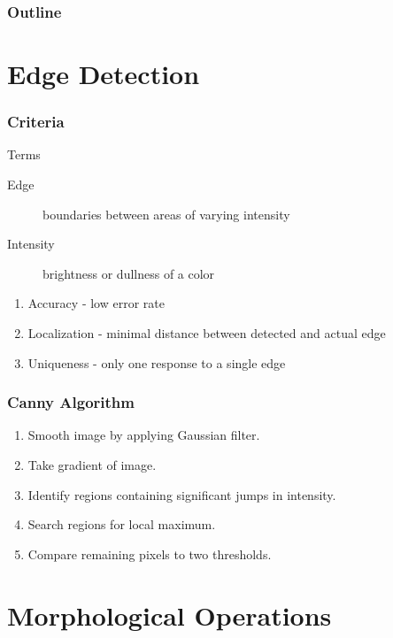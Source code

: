 \documentclass{beamer}
\newcommand{\linespace}{\vskip 0.25cm}
\begin{document}
\begin{frame}
  \frametitle{Outline}
  \tableofcontents[hideallsubsections]
\end{frame}

\section[Edge Detection]{Edge Detection}

\begin{frame}
\frametitle{Criteria}
Terms
\begin{description}
\item[Edge] boundaries between areas of varying intensity
\item[Intensity] brightness or dullness of a color
\end{description}
\linespace
\linespace
\begin{enumerate}
\item Accuracy - low error rate
\item Localization - minimal distance between detected and actual edge
\item Uniqueness - only one response to a single edge
\end{enumerate}
\end{frame}

\begin{frame}
\frametitle{Canny Algorithm}
\begin{enumerate}
\item Smooth image by applying Gaussian filter.
\linebreak
\item Take gradient of image.
\linebreak
\item Identify regions containing significant jumps in intensity.
\linebreak
\item Search regions for local maximum.
\linebreak
\item Compare remaining pixels to two thresholds.
\end{enumerate}
\end{frame}

\section[Morphological Operations]{Morphological Operations}
\end{document}
